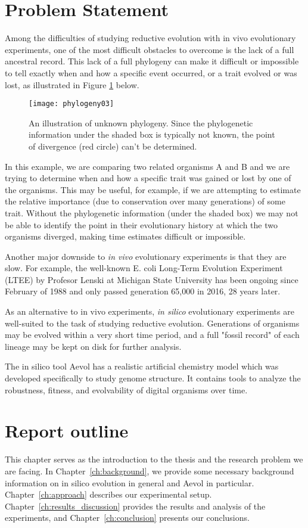 \section{Problem Statement} \label{problem_statement}
Among the difficulties of studying reductive evolution with in vivo evolutionary experiments, one of the most difficult obstacles to overcome is the lack of a full ancestral record. This lack of a full phylogeny can make it difficult or impossible to tell exactly when and how a specific event occurred, or a trait evolved or was lost, as illustrated in Figure \ref{fig:phylogeny03} below. 
\begin{figure}[h]\label{fig:phylogeny03}
\texttt{[image: phylogeny03]}
\centering
\caption{An illustration of unknown phylogeny. Since the phylogenetic information under the shaded box is typically not known, the point of divergence (red circle) can't be determined.}
\end{figure}
In this example, we are comparing two related organisms A and B and we are trying to determine when and how a specific trait was gained or lost by one of the organisms. This may be useful, for example, if we are attempting to estimate the relative importance (due to conservation over many generations) of some trait. Without the phylogenetic information (under the shaded box) we may not be able to identify the point in their evolutionary history at which the two organisms diverged, making time estimates difficult or impossible.

Another major downside to \textit{in vivo} evolutionary experiments is that they are slow. For example, the well-known E. coli Long-Term Evolution Experiment (LTEE) by Profesor Lenski at Michigan State University has been ongoing since February of 1988 and only passed generation 65,000 in 2016, 28 years later. 

As an alternative to in vivo experiments, \textit{in silico} evolutionary experiments are well-suited to the task of studying reductive evolution. Generations of organisms may be evolved within a very short time period, and a full "fossil record" of each lineage may be kept on disk for further analysis. 

The in silico tool Aevol has a realistic artificial chemistry model which was developed specifically to study genome structure. It contains tools to analyze the robustness, fitness, and evolvability of digital organisms over time.  

\section{Report outline}
This chapter serves as the introduction to the thesis and the research problem we are facing. In Chapter~\ref{ch:background}, we provide some necessary background information on in silico evolution in general and Aevol in particular. Chapter~\ref{ch:approach} describes our experimental setup. Chapter~\ref{ch:results_discussion}
provides the results and analysis of the experiments, and Chapter~\ref{ch:conclusion} presents our conclusions. 


